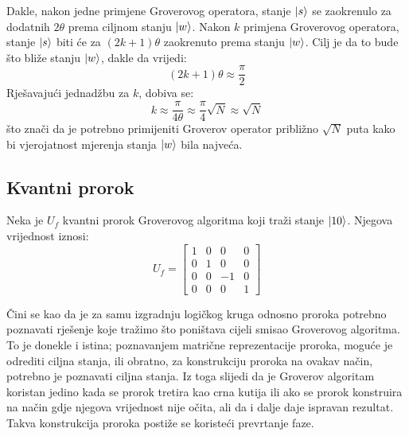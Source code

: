 Dakle, nakon jedne primjene Groverovog operatora, stanje $\ket{s}$ se zaokrenulo za dodatnih $2\theta$ prema ciljnom stanju $\ket{w}$. Nakon $k$ primjena Groverovog operatora, stanje $\ket{s}$ biti će za $(2k + 1)\theta$ zaokrenuto prema stanju $\ket{w}$. Cilj je da to bude što bliže stanju $\ket{w}$, dakle da vrijedi:
\[
(2k + 1)\theta \approx \frac{\pi}{2}
\]
Rješavajući jednadžbu za $k$, dobiva se:
\[
k \approx \frac{\pi}{4\theta} \approx \frac{\pi}{4}\sqrt{N} \approx \sqrt{N}
\]
što znači da je potrebno primijeniti Groverov operator približno $\sqrt{N}$ puta kako bi vjerojatnost mjerenja stanja $\ket{w}$ bila najveća.

\subsection{Kvantni prorok}

Neka je $U_f$ kvantni prorok Groverovog algoritma koji traži stanje $\ket{10}$. Njegova vrijednost iznosi:
\[
U_f = \begin{bmatrix}
1 & 0 & 0 & 0 \\
0 & 1 & 0 & 0 \\
0 & 0 & -1 & 0 \\
0 & 0 & 0 & 1
\end{bmatrix}
\]

Čini se kao da je za samu izgradnju logičkog kruga odnosno proroka potrebno poznavati rješenje koje tražimo što poništava cijeli smisao Groverovog algoritma. To je donekle i istina; poznavanjem matrične reprezentacije proroka, moguće je odrediti ciljna stanja, ili obratno, za konstrukciju proroka na ovakav način, potrebno je poznavati ciljna stanja. Iz toga slijedi da je Groverov algoritam koristan jedino kada se prorok tretira kao crna kutija ili ako se prorok konstruira na način gdje njegova vrijednost nije očita, ali da i dalje daje ispravan rezultat. Takva konstrukcija proroka postiže se koristeći prevrtanje faze.

